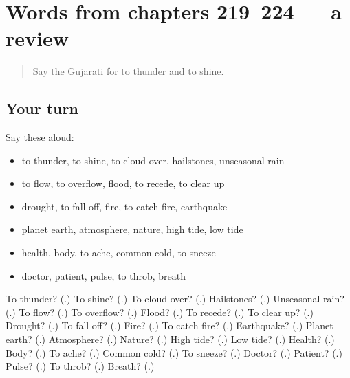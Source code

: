 \section[(dialogue)]{Words from chapters 219–224 — a review}

\label{lesson:GU-R224-review-219-224}



\begin{quote}
Say the Gujarati for to thunder and to shine.
\end{quote}

\subsection*{Your turn}
Say these aloud:

\begin{itemize}
\raggedright
  \item to thunder, to shine, to cloud over, hailstones, unseasonal rain
  \item to flow, to overflow, flood, to recede, to clear up
  \item drought, to fall off, fire, to catch fire, earthquake
  \item planet earth, atmosphere, nature, high tide, low tide
  \item health, body, to ache, common cold, to sneeze
  \item doctor, patient, pulse, to throb, breath
\end{itemize}

\begin{tcolorbox}[breakable,colback=teal!4,colframe=teal!35!black,title={Before you move on}]
To thunder? (\textbf{}.) To shine? (\textbf{}.) To cloud over? (\textbf{}.) Hailstones? (\textbf{}.) Unseasonal rain? (\textbf{}.) To flow? (\textbf{}.) To overflow? (\textbf{}.) Flood? (\textbf{}.) To recede? (\textbf{}.) To clear up? (\textbf{}.) Drought? (\textbf{}.) To fall off? (\textbf{}.) Fire? (\textbf{}.) To catch fire? (\textbf{}.) Earthquake? (\textbf{}.) Planet earth? (\textbf{}.) Atmosphere? (\textbf{}.) Nature? (\textbf{}.) High tide? (\textbf{}.) Low tide? (\textbf{}.) Health? (\textbf{}.) Body? (\textbf{}.) To ache? (\textbf{}.) Common cold? (\textbf{}.) To sneeze? (\textbf{}.) Doctor? (\textbf{}.) Patient? (\textbf{}.) Pulse? (\textbf{}.) To throb? (\textbf{}.) Breath? (\textbf{}.)
\end{tcolorbox}
